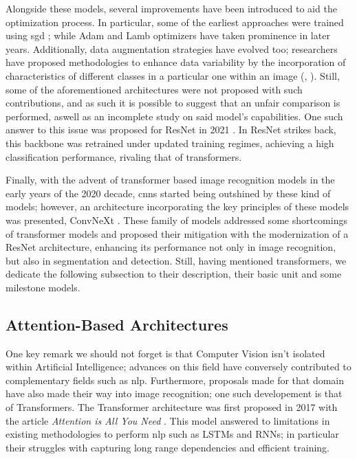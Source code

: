Alongside these models, several improvements have been introduced to aid the optimization process. 
In particular, some of the earliest approaches were trained using \gls{sgd} 
\autocite{bottou2010large}; while Adam \autocite{kingma2014adam} and Lamb \autocite{you2019large} 
optimizers have taken prominence in later years. Additionally, data augmentation strategies have 
evolved too; researchers have proposed methodologies to enhance data variability by the 
incorporation of characteristics of different classes in a particular one within an image 
(\cite{zhang2017mixup}, \cite{yun2019cutmix}). Still, some of the aforementioned architectures 
were not proposed with such contributions, and as such it is possible to suggest that an unfair 
comparison is performed, aswell as an incomplete study on said model's capabilities. One such 
answer to this issue was proposed for ResNet in 2021 \autocite{wightman2021resnet}. In 
ResNet strikes back, this backbone was retrained under updated training regimes, achieving a 
high classification performance, rivaling that of transformers.

Finally, with the advent of transformer based image recognition models in the early years of the 
2020 decade, \glspl{cnn} started being outshined by these kind of models; however, an architecture 
incorporating the key principles of these models was presented, ConvNeXt \autocite{liu2022convnet}.
These family of models addressed some shortcomings of transformer models and proposed their 
mitigation with the modernization of a ResNet architecture, enhancing its performance not only in 
image recognition, but also in segmentation and detection. Still, having mentioned transformers, 
we dedicate the following subsection to their description, their basic unit and some milestone 
models.


\subsection{Attention-Based Architectures}
\label{rel:sub_att}
One key remark we should not forget is that Computer Vision isn't isolated within Artificial 
Intelligence; advances on this field have conversely contributed to complementary fields such as 
\gls{nlp}. Furthermore, proposals made for that domain have also made their way into image 
recognition; one such developement is that of Transformers. The Transformer architecture was first 
proposed in 2017 with the article \emph{Attention is All You Need} \autocite{vaswani2017attention}. 
This model answered to limitations in existing methodologies to perform \gls{nlp} such as LSTMs and 
RNNs; in particular their struggles with capturing long range dependencies and efficient training. 

